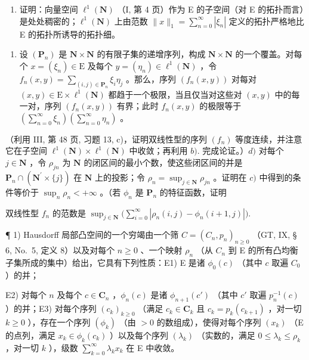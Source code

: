 \begin{enumerate}
\def\labelenumi{\alph{enumi})}
\setcounter{enumi}{1}
\tightlist
\item
  证明：向量空间 \(\ell^1 (\mathbf{N})\) （I, 第 4 页）作为 E 的子空间（对 E 的拓扑而言）是处处稠密的；\(\ell^1 (\mathbf{N})\) 上由范数 \(\| x\| _1 = \sum_{n = 0}^{\infty}|\xi_n|\) 定义的拓扑严格地比 E 的拓扑所诱导的拓扑细。
\end{enumerate}

\begin{enumerate}
\def\labelenumi{\alph{enumi})}
\setcounter{enumi}{2}
\tightlist
\item
  设 \((\mathbf{P}_n)\) 是 \(\mathbf{N} \times \mathbf{N}\) 的有限子集的递增序列，构成 \(\mathbf{N} \times \mathbf{N}\) 的一个覆盖。对每个 \(x = (\xi_n) \in \mathrm{E}\) 及每个 \(y = (\eta_n) \in \ell^1(\mathbf{N})\) ，令 \(f_n(x, y) = \sum_{(i,j) \in \mathbf{P}_n} \xi_i \eta_j\) 。那么，序列 \((f_n(x, y))\) 对每对 \((x, y) \in \mathrm{E} \times \ell^1(\mathbf{N})\) 都趋于一个极限，当且仅当对这些对 \((x, y)\) 中的每一对，序列 \((f_n(x, y))\) 有界；此时 \(f_n(x, y)\) 的极限等于 \(\left(\sum_{n=0}^{\infty} \xi_n\right) \left(\sum_{n=0}^{\infty} \eta_n\right)\) 。
\end{enumerate}

（利用 III, 第 48 页, 习题 13, c)，证明双线性型的序列 \((f_n)\) 等度连续，并注意它在子空间 \(\ell^1 (\mathbf{N})\times \ell^1 (\mathbf{N})\) 中收敛；再利用 \(b).\) 完成论证。）\(d)\) 对每个 \(j\in \mathbf{N}\) ，令 \(\rho_{jn}\) 为 \(\mathbf{N}\) 的闭区间的最小个数，使这些闭区间的并是 \(\mathbf{P}_n\cap (\mathbf{N}^{\prime}\times \{j\})\) 在 \(\mathbf{N}\) 上的投影；令 \(\rho_{n} = \sup_{j\in \mathbf{N}}\rho_{jn}\) 。证明在 \(c)\) 中得到的条件等价于 \(\sup_n\rho_n < + \infty\) 。（若 \(\phi_n\) 是 \(\mathbf{P}_n\) 的特征函数，证明

双线性型 \(f_{n}\) 的范数是 \(\sup_{j\in \mathbf{N}}\big(\sum_{i = 0}^{\infty}|\rho_n(i,j) - \phi_n(i + 1,j)|\big).\)

\exercisegroup

¶ 1) Hausdorff 局部凸空间的一个穷竭由一个筛 \(C = (C_n, p_n)_{n \geqslant 0}\) （GT, IX, § 6, No.~5, 定义 8）以及对每个 \(n \geqslant 0\) 、一个映射 \(\rho_n\) （从 \(C_n\) 到 E 的所有凸均衡子集所成的集中）给出，它具有下列性质：E1) E 是诸 \(\phi_0(c)\) （其中 \(c\) 取遍 \(C_0\) ）的并；

E2) 对每个 \(n\) 及每个 \(c \in \mathbf{C}_n\) ，\(\phi_n(c)\) 是诸 \(\phi_{n+1}(c')\) （其中 \(c'\) 取遍 \(p_n^{-1}(c)\) ）的并；E3) 对每个序列 \((c_k)_{k \geqslant 0}\) （满足 \(c_k \in \mathbf{C}_k\) 且 \(c_k = p_k(c_{k+1})\) ，对一切 \(k \geqslant 0\) ），存在一个序列 \((\phi_k)\) （由 \(>0\) 的数组成），使得对每个序列 \((x_k)\) （E 的点列，满足 \(x_k \in \phi_k(c_k)\) ）以及每个序列 \((\lambda_k)\) （实数的，满足 \(0 \leqslant \lambda_k \leqslant \rho_k\) ，对一切 \(k\) ），级数 \(\sum_{k=0}^{\infty} \lambda_k x_k\) 在 E 中收敛。

